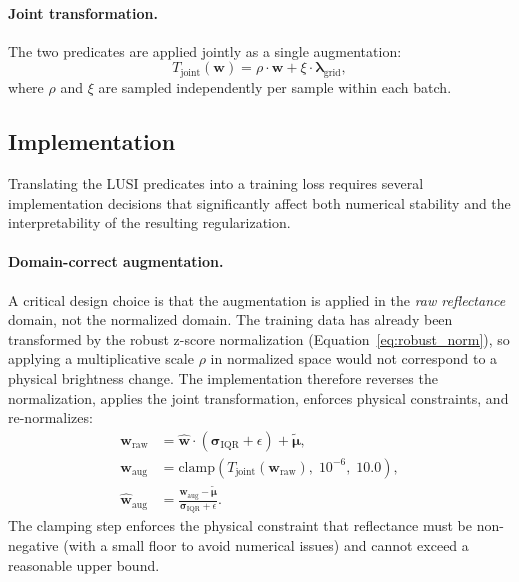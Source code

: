 \documentclass[11pt]{report}
\begin{document}
\paragraph{Joint transformation.}
The two predicates are applied jointly as a single augmentation:
\begin{equation}
T_{\text{joint}}(\mathbf{w}) = \rho \cdot \mathbf{w} + \xi \cdot \boldsymbol{\lambda}_{\text{grid}},
\label{eq:joint_transform}
\end{equation}
where $\rho$ and $\xi$ are sampled independently per sample within each batch.

\subsection{Implementation}
\label{sec:lusi_implementation}

Translating the LUSI predicates into a training loss requires several implementation decisions that significantly affect both numerical stability and the interpretability of the resulting regularization.

\paragraph{Domain-correct augmentation.}
A critical design choice is that the augmentation is applied in the \emph{raw reflectance} domain, not the normalized domain. The training data has already been transformed by the robust z-score normalization (Equation~\ref{eq:robust_norm}), so applying a multiplicative scale $\rho$ in normalized space would not correspond to a physical brightness change. The implementation therefore reverses the normalization, applies the joint transformation, enforces physical constraints, and re-normalizes:
\begin{align}
\mathbf{w}_{\text{raw}} &= \hat{\mathbf{w}} \cdot (\boldsymbol{\sigma}_{\text{IQR}} + \epsilon) + \tilde{\boldsymbol{\mu}}, \label{eq:lusi_denorm} \\
\mathbf{w}_{\text{aug}} &= \text{clamp}\left(T_{\text{joint}}(\mathbf{w}_{\text{raw}}),\; 10^{-6},\; 10.0\right), \label{eq:lusi_clamp} \\
\hat{\mathbf{w}}_{\text{aug}} &= \frac{\mathbf{w}_{\text{aug}} - \tilde{\boldsymbol{\mu}}}{\boldsymbol{\sigma}_{\text{IQR}} + \epsilon}. \label{eq:lusi_renorm}
\end{align}
The clamping step enforces the physical constraint that reflectance must be non-negative (with a small floor to avoid numerical issues) and cannot exceed a reasonable upper bound.
\end{document}
